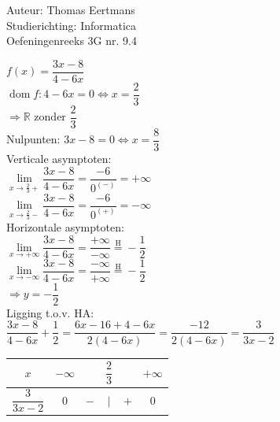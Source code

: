 \documentclass[a4paper]{article}
\begin{document}
  
\noindent \large Auteur: Thomas Eertmans \\
\noindent \large Studierichting: Informatica\\
\noindent \large Oefeningenreeks 3G nr. 9.4\\

\medskip

\normalsize

$f(x) = \dfrac{3x-8}{4-6x}$ \\

$\operatorname{dom}f: 4-6x = 0 \Leftrightarrow x = \dfrac{2}{3}$ \\

$\Rightarrow \mathbb{R}$ zonder $\dfrac{2}{3}$ \\

Nulpunten: $3x-8 = 0 \Leftrightarrow x = \dfrac{8}{3}$ \\

Verticale asymptoten: \\

$\lim\limits_{x\rightarrow\tfrac{2}{3}+} \dfrac{3x-8}{4-6x} = \dfrac{-6}{0^{(-)}} = +\infty$ \\

$\lim\limits_{x\rightarrow\tfrac{2}{3}-} \dfrac{3x-8}{4-6x} = \dfrac{-6}{0^{(+)}} = -\infty$ \\

Horizontale asymptoten: \\

$\lim\limits_{x\rightarrow+\infty} \dfrac{3x-8}{4-6x} = \dfrac{+\infty}{-\infty} \overset{\mathrm{H}}{=} -\dfrac{1}{2}$ \\

$\lim\limits_{x\rightarrow-\infty} \dfrac{3x-8}{4-6x} = \dfrac{-\infty}{+\infty} \overset{\mathrm{H}}{=} -\dfrac{1}{2}$ \\

$\Rightarrow y = -\dfrac{1}{2}$ \\

Ligging t.o.v. HA: \\

$\dfrac{3x-8}{4-6x} + \dfrac{1}{2} = \dfrac{6x-16+4-6x}{2(4-6x)} = \dfrac{-12}{2(4-6x)} = \dfrac{3}{3x-2}$ \\

\begin{tabular}{c|ccccc}
$x$ & $-\infty$ & & $\dfrac{2}{3}$ & & $+\infty$ \\ \hline
$\dfrac{3}{3x-2}$ & $0$ & $-$ & $|$ & $+$ & $0$ \\ 
\end{tabular}
\end{document}
